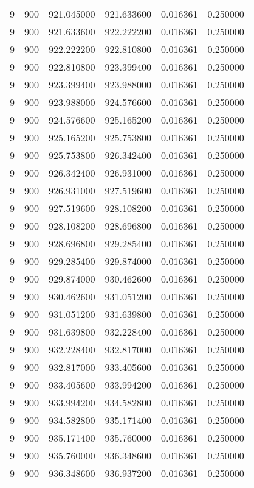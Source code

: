 \begin{longtable}{rrrrrr}
9 & 900 & 921.045000 & 921.633600 & 0.016361 & 0.250000 \\
9 & 900 & 921.633600 & 922.222200 & 0.016361 & 0.250000 \\
9 & 900 & 922.222200 & 922.810800 & 0.016361 & 0.250000 \\
9 & 900 & 922.810800 & 923.399400 & 0.016361 & 0.250000 \\
9 & 900 & 923.399400 & 923.988000 & 0.016361 & 0.250000 \\
9 & 900 & 923.988000 & 924.576600 & 0.016361 & 0.250000 \\
9 & 900 & 924.576600 & 925.165200 & 0.016361 & 0.250000 \\
9 & 900 & 925.165200 & 925.753800 & 0.016361 & 0.250000 \\
9 & 900 & 925.753800 & 926.342400 & 0.016361 & 0.250000 \\
9 & 900 & 926.342400 & 926.931000 & 0.016361 & 0.250000 \\
9 & 900 & 926.931000 & 927.519600 & 0.016361 & 0.250000 \\
9 & 900 & 927.519600 & 928.108200 & 0.016361 & 0.250000 \\
9 & 900 & 928.108200 & 928.696800 & 0.016361 & 0.250000 \\
9 & 900 & 928.696800 & 929.285400 & 0.016361 & 0.250000 \\
9 & 900 & 929.285400 & 929.874000 & 0.016361 & 0.250000 \\
9 & 900 & 929.874000 & 930.462600 & 0.016361 & 0.250000 \\
9 & 900 & 930.462600 & 931.051200 & 0.016361 & 0.250000 \\
9 & 900 & 931.051200 & 931.639800 & 0.016361 & 0.250000 \\
9 & 900 & 931.639800 & 932.228400 & 0.016361 & 0.250000 \\
9 & 900 & 932.228400 & 932.817000 & 0.016361 & 0.250000 \\
9 & 900 & 932.817000 & 933.405600 & 0.016361 & 0.250000 \\
9 & 900 & 933.405600 & 933.994200 & 0.016361 & 0.250000 \\
9 & 900 & 933.994200 & 934.582800 & 0.016361 & 0.250000 \\
9 & 900 & 934.582800 & 935.171400 & 0.016361 & 0.250000 \\
9 & 900 & 935.171400 & 935.760000 & 0.016361 & 0.250000 \\
9 & 900 & 935.760000 & 936.348600 & 0.016361 & 0.250000 \\
9 & 900 & 936.348600 & 936.937200 & 0.016361 & 0.250000 \\

\end{longtable}
